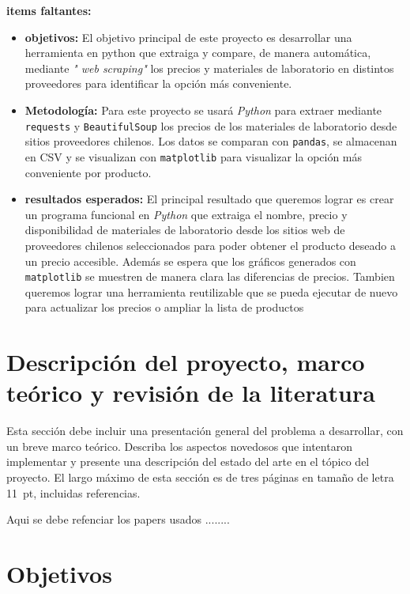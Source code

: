 \documentclass[11pt,spanish]{article}
\begin{document}
\textbf{ items faltantes:}
\begin{itemize}
\item \textbf{objetivos:} El objetivo principal de este proyecto es desarrollar una herramienta en python que extraiga y compare, de manera automática, mediante \textit{" web scraping"} los precios y materiales de laboratorio en distintos proveedores para identificar la opción más conveniente.
\item \textbf{Metodología:} Para este proyecto se usará \textit{Python} para extraer mediante \texttt{requests} y \texttt{BeautifulSoup} los precios de los materiales de laboratorio desde sitios proveedores chilenos. Los datos se comparan con \texttt{pandas}, se almacenan en CSV y se visualizan con \texttt{matplotlib} para visualizar la opción más conveniente por producto.
\item \textbf{resultados esperados:} El principal resultado que queremos lograr es crear un programa funcional en \textit{Python} que extraiga el nombre, precio y disponibilidad de materiales de laboratorio desde los sitios web de proveedores chilenos seleccionados para poder obtener el producto deseado a un precio accesible. Además se espera que los gráficos generados con \texttt{matplotlib} se muestren de manera clara las diferencias de precios. Tambien queremos lograr una herramienta reutilizable que se pueda ejecutar de nuevo para actualizar los precios o ampliar la lista de productos
\end{itemize}
\newpage

\section{Descripción del proyecto, marco teórico y revisión de la literatura}

\begin{framed}
  \noindent Esta sección debe incluir una presentación general del
  problema a desarrollar, con un breve marco teórico. Describa los
  aspectos novedosos que intentaron implementar y presente una
  descripción del estado del arte en el tópico del proyecto. El largo
  máximo de esta sección es de tres páginas en tamaño de letra 11~pt,
  incluidas referencias.
\end{framed}
Aqui se debe refenciar los papers usados ........
\newpage

\section{Objetivos}
\end{document}
